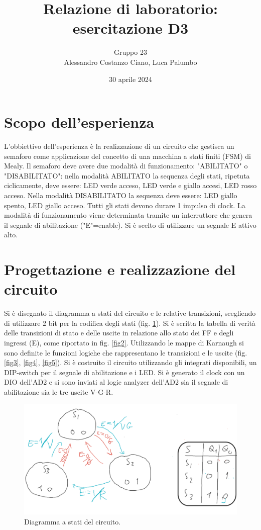 \documentclass[10pt,a4paper]{article}
\author{Gruppo 23 \\ Alessandro Costanzo Ciano, Luca Palumbo}
\title{Relazione di laboratorio: esercitazione D3}
\begin{document}
\date{30 aprile 2024}
\maketitle

\section{Scopo dell'esperienza}
L'obbiettivo dell'esperienza è la realizzazione di un circuito che gestisca un semaforo come applicazione del concetto di una macchina a stati finiti (FSM) di Mealy. Il semaforo deve avere due modalità di funzionamento: "ABILITATO" o "DISABILITATO": nella modalità ABILITATO la sequenza degli stati, ripetuta ciclicamente, deve essere: LED verde acceso, LED verde e giallo accesi, LED rosso acceso. Nella modalità DISABILITATO la sequenza deve essere: LED giallo spento, LED giallo acceso. Tutti gli stati devono durare 1 impulso di clock. La modalità di funzionamento viene determinata tramite un interruttore che genera il segnale di abilitazione ("E"=enable). Si è scelto di utilizzare un segnale E attivo alto.

\section{Progettazione e realizzazione del circuito}
Si è disegnato il diagramma a stati del circuito e le relative transizioni, scegliendo di utilizzare 2 bit per la codifica degli stati (fig. \ref{fig1}). Si è scritta la tabella di verità delle transizioni di stato e delle uscite in relazione allo stato dei FF e degli ingressi (E), come riportato in fig. \ref{fig2}. Utilizzando le mappe di Karnaugh si sono definite le funzioni logiche che rappresentano le transizioni e le uscite (fig. \ref{fig3}, \ref{fig4}, \ref{fig5}). Si è costruito il circuito utilizzando gli integrati disponibili, un DIP-switch per il segnale di abilitazione e i LED. Si è generato il clock con un DIO dell'AD2 e si sono inviati al logic analyzer dell'AD2 sia il segnale di abilitazione sia le tre uscite V-G-R.


\begin{figure}[htp]
    \begin{center}
    \includegraphics[scale=0.25]{fig1.png}
    \caption{Diagramma a stati del circuito.}
    \label{fig1}
    \end{center}
\end{figure}
\end{document}

